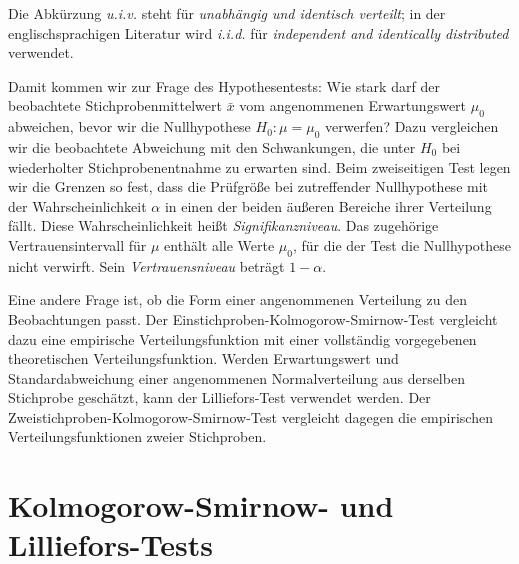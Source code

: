 Die Abkürzung \textsl{u.i.v.} steht für \textsl{unabhängig und
identisch verteilt}; in der englischsprachigen Literatur wird
\textsl{i.i.d.} für \textsl{independent and identically distributed}
verwendet.

Damit kommen wir zur Frage des Hypothesentests: Wie stark darf der
beobachtete Stichprobenmittelwert $\bar x$ vom angenommenen
Erwartungswert $\mu_0$ abweichen, bevor wir die Nullhypothese
$H_0:\mu=\mu_0$ verwerfen? Dazu vergleichen wir die beobachtete
Abweichung mit den Schwankungen, die unter $H_0$ bei wiederholter
Stichprobenentnahme zu erwarten sind. Beim zweiseitigen Test
legen wir die Grenzen so fest, dass die Prüfgröße bei zutreffender
Nullhypothese mit der Wahrscheinlichkeit $\alpha$ in einen der
beiden äußeren Bereiche ihrer Verteilung fällt. Diese
Wahrscheinlichkeit heißt \textsl{Signifikanzniveau}. Das
zugehörige Vertrauensintervall für $\mu$ enthält alle Werte
$\mu_0$, für die der Test die Nullhypothese nicht verwirft.
Sein \textsl{Vertrauensniveau} beträgt $1-\alpha$.

Eine andere Frage ist, ob die Form einer angenommenen Verteilung
zu den Beobachtungen passt. Der Einstichproben-Kolmogorow-Smirnow-Test
vergleicht dazu eine empirische Verteilungsfunktion mit einer
vollständig vorgegebenen theoretischen Verteilungsfunktion.
Werden Erwartungswert und Standardabweichung einer angenommenen
Normalverteilung aus derselben Stichprobe geschätzt, kann der
Lilliefors-Test verwendet werden. Der
Zweistichproben-Kolmogorow-Smirnow-Test vergleicht dagegen die
empirischen Verteilungsfunktionen zweier Stichproben.

\section{Kolmogorow-Smirnow- und Lilliefors-Tests}

